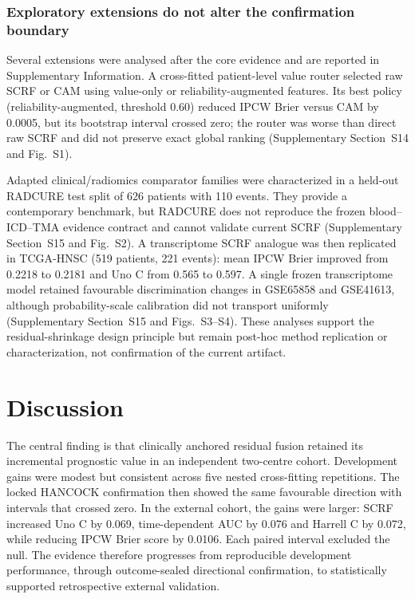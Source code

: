\documentclass[pdflatex,sn-nature]{sn-jnl}
\begin{document}
\subsubsection*{Exploratory extensions do not alter the confirmation boundary}

Several extensions were analysed after the core evidence and are reported in Supplementary Information. A cross-fitted patient-level value router selected raw SCRF or CAM using value-only or reliability-augmented features. Its best policy (reliability-augmented, threshold 0.60) reduced IPCW Brier versus CAM by 0.0005, but its bootstrap interval crossed zero; the router was worse than direct raw SCRF and did not preserve exact global ranking (Supplementary Section~S14 and Fig.~S1).

Adapted clinical/radiomics comparator families were characterized in a held-out RADCURE test split of 626 patients with 110 events. They provide a contemporary benchmark, but RADCURE does not reproduce the frozen blood--ICD--TMA evidence contract and cannot validate current SCRF (Supplementary Section~S15 and Fig.~S2). A transcriptome SCRF analogue was then replicated in TCGA-HNSC (519 patients, 221 events): mean IPCW Brier improved from 0.2218 to 0.2181 and Uno C from 0.565 to 0.597. A single frozen transcriptome model retained favourable discrimination changes in GSE65858 and GSE41613, although probability-scale calibration did not transport uniformly (Supplementary Section~S15 and Figs.~S3--S4). These analyses support the residual-shrinkage design principle but remain post-hoc method replication or characterization, not confirmation of the current artifact.

\section{Discussion}

The central finding is that clinically anchored residual fusion retained its incremental prognostic value in an independent two-centre cohort. Development gains were modest but consistent across five nested cross-fitting repetitions. The locked HANCOCK confirmation then showed the same favourable direction with intervals that crossed zero. In the external cohort, the gains were larger: SCRF increased Uno C by 0.069, time-dependent AUC by 0.076 and Harrell C by 0.072, while reducing IPCW Brier score by 0.0106. Each paired interval excluded the null. The evidence therefore progresses from reproducible development performance, through outcome-sealed directional confirmation, to statistically supported retrospective external validation.
\end{document}
